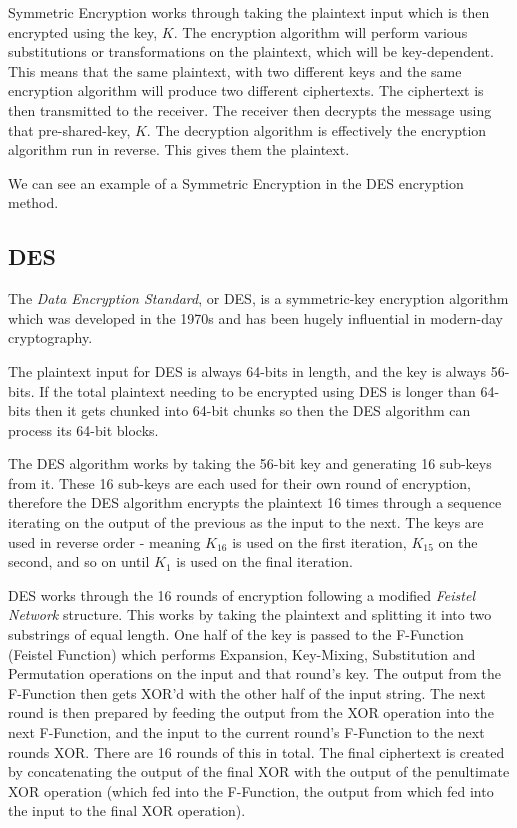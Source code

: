 Symmetric Encryption works through taking the plaintext input which is then encrypted using the key, $K$. The encryption algorithm will perform various substitutions or transformations on the plaintext, which will be key-dependent. This means that the same plaintext, with two different keys and the same encryption algorithm will produce two different ciphertexts. The ciphertext is then transmitted to the receiver. The receiver then decrypts the message using that pre-shared-key, $K$. The decryption algorithm is effectively the encryption algorithm run in reverse. This gives them the plaintext. 

We can see an example of a Symmetric Encryption in the DES encryption method.

\subsection{DES}
The \textit{Data Encryption Standard}, or DES, is a symmetric-key encryption algorithm which was developed in the 1970s and has been hugely influential in modern-day cryptography.

The plaintext input for DES is always 64-bits in length, and the key is always 56-bits. If the total plaintext needing to be encrypted using DES is longer than 64-bits then it gets chunked into 64-bit chunks so then the DES algorithm can process its 64-bit blocks. 

The DES algorithm works by taking the 56-bit key and generating 16 sub-keys from it. These 16 sub-keys are each used for their own round of encryption, therefore the DES algorithm encrypts the plaintext 16 times through a sequence iterating on the output of the previous as the input to the next. The keys are used in reverse order - meaning $K_{16}$ is used on the first iteration, $K_{15}$ on the second, and so on until $K_1$ is used on the final iteration. 

DES works through the 16 rounds of encryption following a modified \textit{Feistel Network} structure. This works by taking the plaintext and splitting it into two substrings of equal length. One half of the key is passed to the F-Function (Feistel Function) which performs Expansion, Key-Mixing, Substitution and Permutation operations on the input and that round's key. The output from the F-Function then gets XOR'd with the other half of the input string. The next round is then prepared by feeding the output from the XOR operation into the next F-Function, and the input to the current round's F-Function to the next rounds XOR. There are 16 rounds of this in total. The final ciphertext is created by concatenating the output of the final XOR with the output of the penultimate XOR operation (which fed into the F-Function, the output from which fed into the input to the final XOR operation). 

